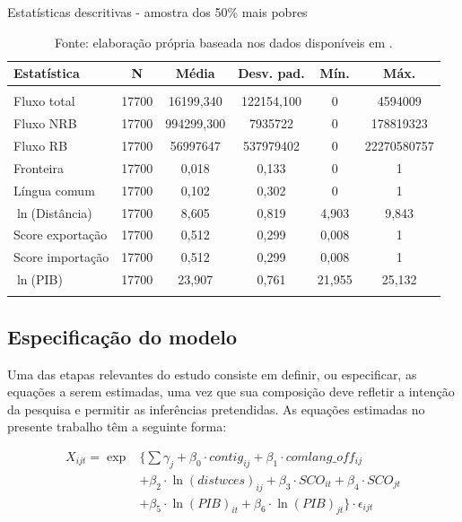 \begin{table}[H] \centering 
	\caption{Estatísticas descritivas - amostra dos 50\% mais pobres} 
	\label{tab:descritivas_pobres} 
	\begin{tabular}{@{\extracolsep{5pt}}lccccc} 
		\\[-1.8ex]\toprule 
		Estatística & \multicolumn{1}{c}{N} & \multicolumn{1}{c}{Média} & \multicolumn{1}{c}{Desv. pad.} & \multicolumn{1}{c}{Mín.} &  \multicolumn{1}{c}{Máx.} \\ 
		\midrule \\[-1.8ex] 
		Fluxo total & 17700 & 16199,340 & 122154,100 & 0 & 4594009 \\ 
		Fluxo NRB & 17700 & 994299,300 & 7935722 & 0 & 178819323 \\ 
		Fluxo RB & 17700 & 56997647 & 537979402 & 0 & 22270580757 \\ 
		Fronteira & 17700 & 0,018 & 0,133 & 0 & 1 \\ 
		Língua comum & 17700 & 0,102 & 0,302 & 0 &  1 \\ 
		$\ln$(Distância) & 17700 & 8,605 & 0,819 & 4,903 & 9,843 \\ 
		Score exportação & 17700 & 0,512 & 0,299 & 0,008  & 1\\ 
		Score importação & 17700 & 0,512 & 0,299 & 0,008  & 1 \\ 
		$\ln$(PIB) & 17700 & 23,907 & 0,761 & 21,955 & 25,132\\
		\bottomrule \\[-1.8ex] 
	\end{tabular} 
\caption*{\RaggedRight  Fonte: elaboração própria baseada nos dados disponíveis em \cite{Cepii2019, Comtrade2019, WorldBank2019}.}
\end{table} 


\subsection{Especificação do modelo}

Uma das etapas relevantes do estudo consiste em definir, ou especificar, as equações a serem estimadas, uma vez que sua composição deve refletir a intenção da pesquisa e permitir as inferências pretendidas. As equações estimadas no presente trabalho têm a seguinte forma:

\begin{align} \label{eq:2}
 X_{ijt} = \exp & \{ \sum \gamma_j + \beta_0 \cdot contig_{ij} + \beta_1 \cdot comlang\_off_{ij}  \nonumber \\ & + \beta_2 \cdot \ln(distwces)_{ij} + \beta_3 \cdot SCO_{it} + \beta_4 \cdot SCO_{jt} \nonumber \\ & + \beta_5 \cdot \ln(PIB)_{it} + \beta_6 \cdot \ln(PIB)_{jt} \} \cdot \epsilon_{ijt}
\end{align}

